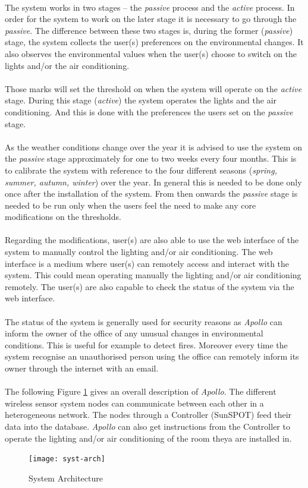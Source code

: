 \documentclass[12pt,a4paper]{report}
\begin{document}
\ \\
The system works in two stages -- the \emph{passive} process and the \emph{active} process. In order for the system to work on the later stage it is necessary to go through the \emph{passive}. The difference between these two stages is, during the former (\emph{passive}) stage, the system collects the user(s) preferences on the environmental changes. It also observes the environmental values when the user(s) choose to switch on the lights and/or the air conditioning.\\
\ \\
Those marks will set the threshold on when the system will operate on the \emph{active} stage. During this stage (\textit{active}) the system operates the lights and the air conditioning. And this is done with the preferences the users set on the \emph{passive} stage.\\
\ \\
As the weather conditions change over the year it is advised to use the system on the \emph{passive} stage approximately for one to two weeks every four months. This is to calibrate the system with reference to the four different seasons (\textit{spring, summer, autumn, winter}) over the year. In general this is needed to be done only once after the installation of the system. From then onwards the \emph{passive} stage is needed to be run only when the users feel the need to make any core modifications on the thresholds.\\
\ \\
Regarding the modifications, user(s) are also able to use the web interface of the system to manually control the lighting and/or air conditioning. The web interface is a medium where user(s) can remotely access and interact with the system. This could mean operating manually the lighting and/or air conditioning remotely. The user(s) are also capable to check the status of the system via the web interface.\\
\ \\
The status of the system is generally used for security reasons as \emph{Apollo} can inform the owner of the office of any unusual changes in environmental conditions. This is useful for example to detect fires. Moreover every time the system recognise an unauthorised person using the office can remotely inform its owner through the internet with an email.\\
\ \\
The following Figure \ref{syst-arch} gives an overall description of \emph{Apollo}. The different wireless sensor system nodes can communicate between each other in a heterogeneous network. The nodes through a Controller (SunSPOT) feed their data into the database. \emph{Apollo} can also get instructions from the Controller to operate the lighting and/or air conditioning of the room theya are installed in.
\ \\
\begin{figure}[H]
\centering
\texttt{[image: syst-arch]}
\caption{System Architecture}
\label{syst-arch}
\end{figure}
\ \\
%
\newpage
%
\end{document}
